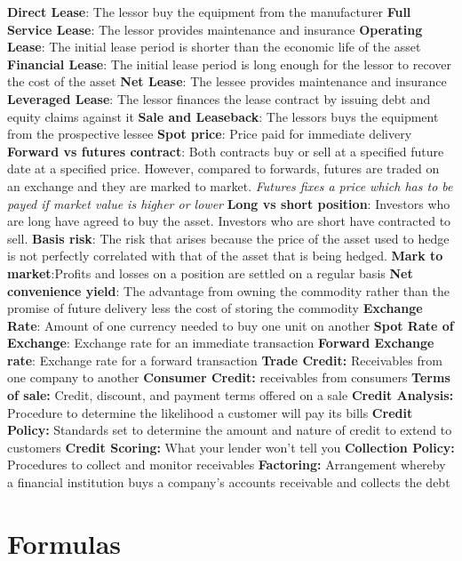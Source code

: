 \documentclass{cheatsheet}
\begin{document}
    \textbf{Direct Lease}: The lessor buy the equipment from the manufacturer
    \textbf{Full Service Lease}: The lessor provides maintenance and insurance
    \textbf{Operating Lease}: The initial lease period is shorter than the economic life of the asset
    \textbf{Financial Lease}: The initial lease period is long enough for the lessor to recover the cost of the asset
    \textbf{Net Lease}: The lessee provides maintenance and insurance
    \textbf{Leveraged Lease}: The lessor finances the lease contract by issuing debt and equity claims against it
    \textbf{Sale and Leaseback}: The lessors buys the equipment from the prospective lessee
    \textbf{Spot price}: Price paid for immediate delivery
    \textbf{Forward vs futures contract}: Both contracts buy or sell at a specified future date at a specified price. However, compared to forwards, futures are traded on an exchange and they are marked to market. \textit{Futures fixes a price which has to be payed if market value is higher or lower}
    \textbf{Long vs short position}: Investors who are long have agreed to buy the asset. Investors who are short have contracted to sell.
    \textbf{Basis risk}: The risk that arises because the price of the asset used to hedge is not perfectly correlated with that of the asset that is being hedged.
    \textbf{Mark to market}:Profits and losses on a position are settled on a regular basis
    \textbf{Net convenience yield}: The advantage from owning the commodity rather than the promise of future delivery less the cost of storing the commodity
    \textbf{Exchange Rate}: Amount of one currency needed to buy one unit on another
    \textbf{Spot Rate of Exchange}: Exchange rate for an immediate transaction
    \textbf{Forward Exchange rate}: Exchange rate for a forward transaction
    \textbf{Trade Credit:} Receivables from one company to another
    \textbf{Consumer Credit:} receivables from consumers
    \textbf{Terms of sale:} Credit, discount, and payment terms offered on a sale
    \textbf{Credit Analysis:} Procedure to determine the likelihood a customer will pay its bills
    \textbf{Credit Policy:} Standards set to determine the amount and nature of credit to extend to customers
    \textbf{Credit Scoring:} What your lender won’t tell you
    \textbf{Collection Policy:} Procedures to collect and monitor receivables
    \textbf{Factoring:} Arrangement whereby a financial institution buys a company's accounts receivable and collects the debt


\section*{Formulas}
\end{document}
